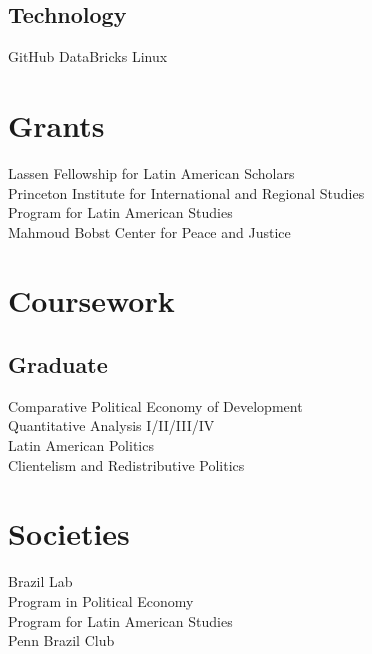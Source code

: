 \documentclass[]{deedy-resume-openfont}
\begin{document}
\begin{minipage}[t]{0.33\textwidth}
    \subsection{Technology}
    GitHub \textbullet{} DataBricks \textbullet{} Linux \\
    \sectionsep
    
    
    
    \section{Grants}
    Lassen Fellowship for Latin American Scholars\\
    Princeton Institute for International and Regional Studies\\
    Program for Latin American Studies\\
    Mahmoud Bobst Center for Peace and Justice
    
    
    \section{Coursework}
    \subsection{Graduate}
    Comparative Political Economy of Development\\
    Quantitative Analysis I/II/III/IV\\
    Latin American Politics\\
    Clientelism and Redistributive Politics
    
    
    \section{Societies}
    Brazil Lab\\
    Program in Political Economy\\
    Program for Latin American Studies\\
    Penn Brazil Club\\
    \sectionsep
    
    

\end{minipage}
\end{document}
